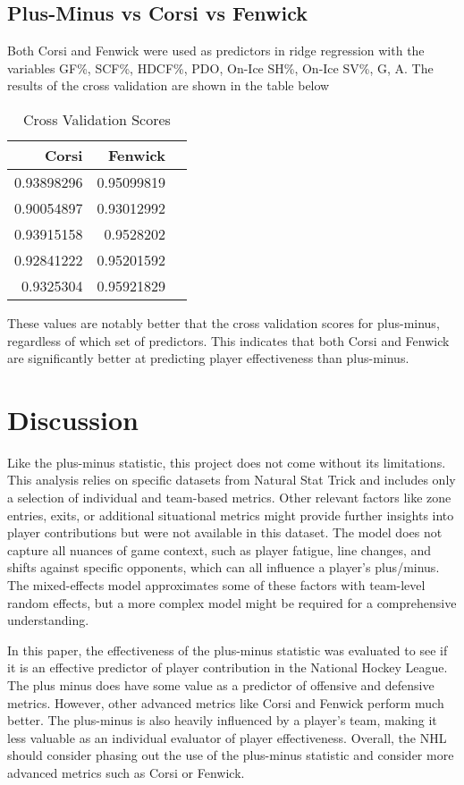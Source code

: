 \documentclass[12pt]{article}
\begin{document}
\subsection{Plus-Minus vs Corsi vs Fenwick}

Both Corsi and Fenwick were used as predictors in ridge regression with the variables GF\%, SCF\%, HDCF\%, PDO, On-Ice SH\%, On-Ice SV\%, G, A.
The results of the cross validation are shown in the table below

\begin{table}[tbp]
  \caption{Cross Validation Scores}
  \label{tab:rv}
\centering
\begin{tabular}{rrr}
  \toprule
Corsi & Fenwick \\ 
  \midrule
  0.93898296 & 0.95099819 \\ 
  0.90054897 & 0.93012992 \\ 
  0.93915158 & 0.9528202 \\ 
  0.92841222 & 0.95201592 \\ 
  0.9325304 & 0.95921829 \\ 
   \bottomrule
\end{tabular}
\end{table}

These values are notably better that the cross validation scores for plus-minus, regardless of which set of predictors. This indicates
that both Corsi and Fenwick are significantly better at predicting player effectiveness than plus-minus.


\section{Discussion}
\label{sec:disc}

Like the plus-minus statistic, this project does not come without its limitations. This analysis relies on specific datasets from 
Natural Stat Trick and includes only a selection of individual and team-based metrics. Other relevant factors like zone entries, exits, or 
additional situational metrics might provide further insights into player contributions but were not available in this dataset. The model 
does not capture all nuances of game context, such as player fatigue, line changes, and shifts against specific opponents, which can all 
influence a player’s plus/minus. The mixed-effects model approximates some of these factors with team-level random effects, but a more 
complex model might be required for a comprehensive understanding.

In this paper, the effectiveness of the plus-minus statistic was evaluated to see if it is an effective predictor of player contribution
in the National Hockey League. The plus minus does have some value as a predictor of offensive and defensive metrics. However, other
advanced metrics like Corsi and Fenwick perform much better. The plus-minus is also heavily influenced by a player's team, making it 
less valuable as an individual evaluator of player effectiveness. Overall, the NHL should consider phasing out the use of the plus-minus
statistic and consider more advanced metrics such as Corsi or Fenwick.
\end{document}
